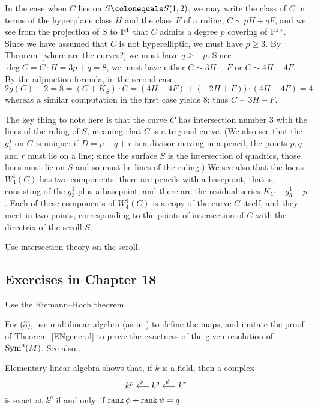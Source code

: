 In the case when $C$ lies on $S \colonequals  S(1,2)$, we may write
the class of $C$ in terms of the hyperplane class $H$ and the class $F$
of a ruling, $C\sim pH+qF$, and we see from the
projection of $S$ to ${\mathbb P}^1$ that $C$ admits
a degree $p$ covering of ${\mathbb P}^1` `$. Since we have assumed that $C$
is not hyperelliptic,
we must have $p\geq 3$. By Theorem~\ref{where are the curves?} we
must have
$q\geq -p$. Since $\deg C = C\cdot H = 3p+q = 8$, we must have either
$C\sim 3H-F$ or $C\sim 4H-4F$. By the adjunction formula, in the second
case,
$$
2g(C)-2 = 8 = (C+K_S)\cdot C = (4H-4F)+(-2H+F))\cdot(4H-4F) =4
$$
whereas a similar computation in the first case yields 8; thus $C\sim
3H-F$.

The key thing to note here is that the curve $C$ has intersection number
3 with the lines of the ruling of $S$, meaning that $C$ is a trigonal
curve. (We also see that the $g^1_3$ on $C$ is unique: if $D = p +
q + r$ is a divisor moving in a pencil, the points $p, q$ and $r$ must
lie on a line; since the surface $S$ is the intersection of quadrics,
those lines must lie on $S$ and so must be  lines  of the ruling.) We
see also that the locus $W^1_4(C)$ has two components: there are pencils
with a basepoint, that is, consisting of the $g^1_3$ plus a basepoint;
and there are the residual series $K_C - g^1_3 - p$. Each of these
components of $W^1_4(C)$ is a copy of the curve $C$ itself, and they
meet in two points, corresponding to the points of intersection of $C$
with the directrix of the scroll $S$.

Use intersection theory on the scroll.
%

\subsection*{Exercises in Chapter 18\nopunct}

Use the Riemann--Roch theorem.

For (3), use multilinear algebra (as in \cite{Eisenbud1995}) to define the
maps, and imitate the proof of Theorem~\ref{ENgeneral} to prove
the exactness of the given resolution of $\operatorname{Sym}^a(M)$. See also
%
\cite[Appendix A2.6]{Eisenbud1995}.

Elementary linear algebra shows that, if $k$ is a field, then a
complex 
$$k^p \luto{\,\phi} k^q \luto{\,\psi} k^r$$ 
is exact at $k^q$ if and
only~if $\operatorname{rank} \phi +\operatorname{rank} \psi = q$.

